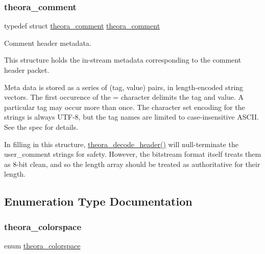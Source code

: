 \subsubsection{\texorpdfstring{theora\+\_\+comment}{theora\_comment}}
{\footnotesize\ttfamily typedef struct \hyperlink{structtheora__comment}{theora\+\_\+comment}  \hyperlink{structtheora__comment}{theora\+\_\+comment}}

Comment header metadata.

This structure holds the in-\/stream metadata corresponding to the \textquotesingle{}comment\textquotesingle{} header packet.

Meta data is stored as a series of (tag, value) pairs, in length-\/encoded string vectors. The first occurence of the \textquotesingle{}=\textquotesingle{} character delimits the tag and value. A particular tag may occur more than once. The character set encoding for the strings is always U\+T\+F-\/8, but the tag names are limited to case-\/insensitive A\+S\+C\+II. See the spec for details.

In filling in this structure, \hyperlink{group__oldfuncs_ga02915e63c1bd733ee291f577a8b75a82}{theora\+\_\+decode\+\_\+header()} will null-\/terminate the user\+\_\+comment strings for safety. However, the bitstream format itself treats them as 8-\/bit clean, and so the length array should be treated as authoritative for their length. 

\subsection{Enumeration Type Documentation}
\mbox{\label{group__oldfuncs_gaa567da4ce591f7373149ce3ef3acdac9}} 
\subsubsection{\texorpdfstring{theora\+\_\+colorspace}{theora\_colorspace}}
{\footnotesize\ttfamily enum \hyperlink{group__oldfuncs_gaa567da4ce591f7373149ce3ef3acdac9}{theora\+\_\+colorspace}}

